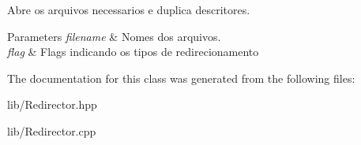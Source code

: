 Abre os arquivos necessarios e duplica descritores. 


\begin{DoxyParams}{Parameters}
{\em filename} & Nomes dos arquivos. \\
\hline
{\em flag} & Flags indicando os tipos de redirecionamento \\
\hline
\end{DoxyParams}


The documentation for this class was generated from the following files:\begin{DoxyCompactItemize}
\item 
lib/Redirector.hpp\item 
lib/Redirector.cpp\end{DoxyCompactItemize}
